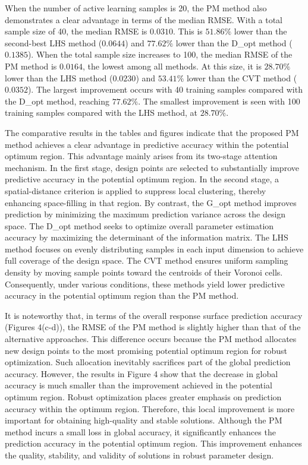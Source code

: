 \documentclass[]{interact}
\theoremstyle{plain}%
\theoremstyle{definition}
\theoremstyle{remark}
\begin{document}
When the number of active learning samples is 20, the PM method also demonstrates a clear advantage in terms of the median RMSE. With a total sample size of 40, the median RMSE is $0.0310$. This is $51.86\%$ lower than the second-best LHS method ($0.0644$) and $77.62\%$ lower than the D\_opt method ($0.1385$). When the total sample size increases to 100, the median RMSE of the PM method is $0.0164$, the lowest among all methods. At this size, it is $28.70\%$ lower than the LHS method ($0.0230$) and $53.41\%$ lower than the CVT method ($0.0352$). The largest improvement occurs with 40 training samples compared with the D\_opt method, reaching $77.62\%$. The smallest improvement is seen with 100 training samples compared with the LHS method, at $28.70\%$.

The comparative results in the tables and figures indicate that the proposed PM method achieves a clear advantage in predictive accuracy within the potential optimum region. This advantage mainly arises from its two-stage attention mechanism. In the first stage, design points are selected to substantially improve predictive accuracy in the potential optimum region. In the second stage, a spatial-distance criterion is applied to suppress local clustering, thereby enhancing space-filling in that region. By contrast, the G\_opt method improves prediction by minimizing the maximum prediction variance across the design space. The D\_opt method seeks to optimize overall parameter estimation accuracy by maximizing the determinant of the information matrix. The LHS method focuses on evenly distributing samples in each input dimension to achieve full coverage of the design space. The CVT method ensures uniform sampling density by moving sample points toward the centroids of their Voronoi cells. Consequently, under various conditions, these methods yield lower predictive accuracy in the potential optimum region than the PM method.

It is noteworthy that, in terms of the overall response surface prediction accuracy (Figures 4(c-d)), the RMSE of the PM method is slightly higher than that of the alternative approaches. This difference occurs because the PM method allocates new design points to the most promising potential optimum region for robust optimization. Such allocation inevitably sacrifices part of the global prediction accuracy. However, the results in Figure 4 show that the decrease in global accuracy is much smaller than the improvement achieved in the potential optimum region. Robust optimization places greater emphasis on prediction accuracy within the optimum region. Therefore, this local improvement is more important for obtaining high-quality and stable solutions. Although the PM method incurs a small loss in global accuracy, it significantly enhances the prediction accuracy in the potential optimum region. This improvement enhances the quality, stability, and validity of solutions in robust parameter design.
\end{document}
